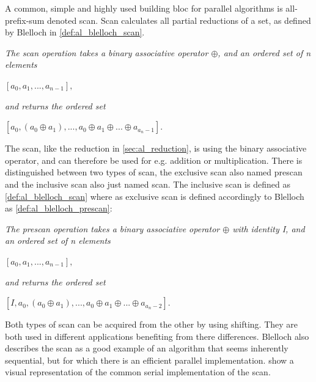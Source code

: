 A common, simple and highly used building bloc for parallel algorithms is all-prefix-sum denoted scan. Scan calculates all partial reductions of a set, as defined by Blelloch \cite{BlellochTR90} in \cref{def:al_blelloch_scan}.

\begin{definition}
\label{def:al_blelloch_scan}
\textit{The scan operation takes a binary associative operator $\oplus$, and an ordered set of n elements}
\begin{center}
$[a_0,a_1,...,a_{n-1}],$
\end{center}
\textit{and returns the ordered set}
\begin{center}
$[a_0, (a_0 \oplus a_1),...,{a_0 \oplus a_1 \oplus ... \oplus a_{a_n-1}}].$
\end{center}
\end{definition} 

The scan, like the reduction in \cref{sec:al_reduction}, is using the binary associative operator, and can therefore be used for e.g. addition or multiplication. There is distinguished between two types of scan, the exclusive scan also named prescan and the inclusive scan also just named scan. The inclusive scan is defined as \cref{def:al_blelloch_scan} where as exclusive scan is defined accordingly to Blelloch \cite{BlellochTR90} as \cref{def:al_blelloch_prescan}:

\begin{definition}
	\label{def:al_blelloch_prescan}
	\textit{The prescan operation takes a binary associative operator $\oplus$ with identity I, and an ordered set of n elements}
	\begin{center}
		$[a_0,a_1,...,a_{n-1}],$
	\end{center}
	\textit{and returns the ordered set}
	\begin{center}
		$[I,a_0, (a_0 \oplus a_1),...,{a_0 \oplus a_1 \oplus ... \oplus a_{a_n-2}}].$
	\end{center}
\end{definition} 

Both types of scan can be acquired from the other by using shifting. They are both used in different applications benefiting from there differences. Blelloch \cite{BlellochTR90} also describes the scan as a good example of an algorithm that seems inherently sequential, but for which there is an efficient parallel implementation.  show a visual representation of the common serial implementation of the scan.  

